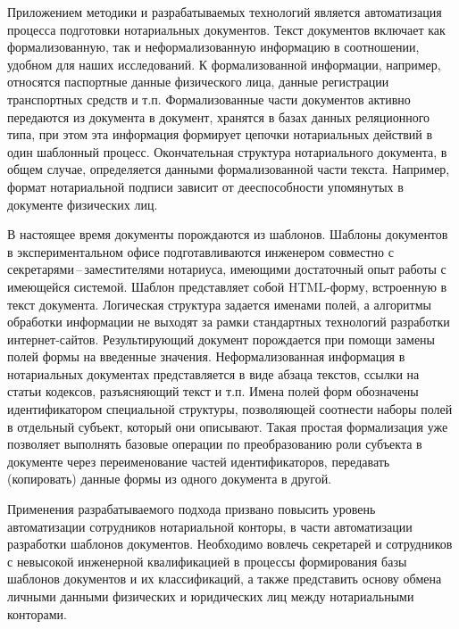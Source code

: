\documentclass[utf8]{../IncArticle}
\newcommand{\e}[2][fcolor]{\textcolor{pcolor}{[}\textcolor{#1}{#2}\textcolor{pcolor}{]}}
\begin{document}
Приложением методики и разрабатываемых технологий является
автоматизация процесса подготовки нотариальных документов.
Текст документов включает как формализованную, так и неформализованную
информацию в соотношении, удобном для наших исследований.  К
формализованной информации, например, относятся паспортные данные
физического лица, данные регистрации транспортных средств и т.п.
Формализованные части документов активно передаются из документа в
документ, хранятся в базах данных реляционного типа, при этом эта
информация формирует цепочки нотариальных действий в один шаблонный
процесс.  Окончательная структура нотариального документа, в общем случае,
определяется данными формализованной части текста.
Например, формат нотариальной подписи зависит от дееспособности
упомянутых в документе физических лиц.

В настоящее время документы порождаются из шаблонов.  Шаблоны
документов в экспериментальном офисе подготавливаются инженером
совместно с секретарями\,--\,заместителями нотариуса, имеющими
достаточный опыт работы с имеющейся системой.  Шаблон представляет
собой HTML-форму, встроенную в текст документа.  Логическая структура
задается именами полей, а алгоритмы обработки информации не выходят за
рамки стандартных технологий разработки интернет-сайтов.
Результирующий документ порождается при помощи замены полей формы на
введенные значения.  Неформализованная информация в нотариальных
документах представляется в виде абзаца текстов, ссылки на статьи
кодексов, разъясняющий текст и т.п.  Имена полей форм обозначены
идентификатором специальной структуры, позволяющей соотнести наборы
полей в отдельный субъект, который они описывают.  Такая простая
формализация уже позволяет выполнять базовые операции по
преобразованию роли субъекта в документе через переименование частей
идентификаторов, передавать (копировать) данные формы из одного
документа в другой.

Применения разрабатываемого подхода призвано повысить уровень
автоматизации сотрудников нотариальной конторы, в части автоматизации
разработки шаблонов документов. Необходимо вовлечь секретарей и
сотрудников с невысокой инженерной квалификацией в процессы
формирования базы шаблонов документов и их классификаций, а также
представить основу обмена личными данными физических и юридических лиц
между нотариальными конторами.

\end{document}
